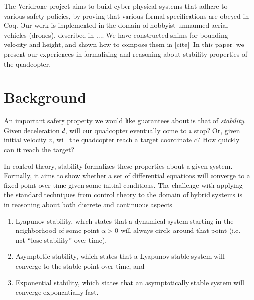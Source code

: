 \documentclass{sigplanconf}
\begin{document}
The Veridrone project aims to build cyber-physical systems that adhere to various safety policies, by proving that various formal specifications are obeyed in Coq. Our work is implemented in the domain of hobbyist unmanned aerial vehicles (drones), described in .... We have constructed shims for bounding velocity and height, and shown how to compose them in [cite]. In this paper, we present our experiences in formalizing and reasoning about stability properties of the quadcopter.





\section{Background}            %



An important safety property we would like guarantees about is that of \emph{stability}. Given deceleration $d$, will our quadcopter eventually come to a stop? Or, given initial velocity $v$, will the quadcopter reach a target coordinate $c$? How quickly can it reach the target?

In control theory, stability formalizes these properties about a given system. Formally, it aims to show whether a set of differential equations will converge to a fixed point over time given some initial conditions. The challenge with applying the standard techniques from control theory to the domain of hybrid systems is in reasoning about both discrete and continuous aspects


\begin{enumerate}
\item Lyapunov stability, which states that a dynamical system starting in the neighborhood of some point $\alpha > 0$ will always circle around that point (i.e. not ``lose stability'' over time),

\item  Asymptotic stability, which states that a Lyapunov stable system will converge to the stable point over time, and

\item  Exponential stability, which states that an asymptotically stable system will converge exponentially fast.
\end{enumerate}
\end{document}

